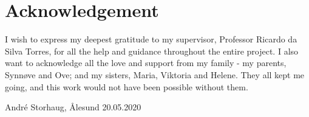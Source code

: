 \section*{Acknowledgement}
I wish to express my deepest gratitude to my supervisor, Professor Ricardo da Silva Torres, for all the help and guidance throughout the entire project. I also want to acknowledge all the love and support from my family - my parents, Synnøve and Ove; and my sisters, Maria, Viktoria and Helene. They all kept me going, and this work would not have been possible without them.
\begin{flushright}
    André Storhaug, \r{A}lesund 20.05.2020
\end{flushright}